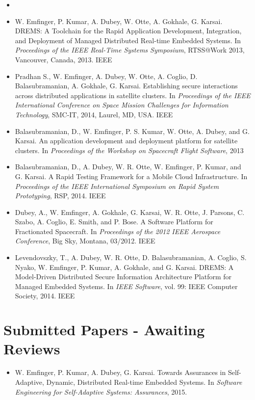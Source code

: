 \begin{itemize}
	
	\item {}
	
	
	\item W. Emfinger, P. Kumar, A. Dubey, W. Otte, A. Gokhale, G. Karsai. DREMS: A Toolchain for the Rapid Application Development, Integration, and Deployment of Managed Distributed Real-time Embedded Systems. In \textit{Proceedings of the IEEE Real-Time Systems Symposium}, RTSS@Work 2013, Vancouver, Canada, 2013. IEEE
	
	
	\item Pradhan S., W. Emfinger, A. Dubey, W. Otte, A. Coglio, D. Balasubramanian, A. Gokhale, G. Karsai. Establishing secure interactions across distributed applications in satellite clusters. In \textit{Proceedings of the IEEE International Conference on Space Mission Challenges for Information Technology}, SMC-IT, 2014, Laurel, MD, USA. IEEE
	
	
	\item Balasubramanian, D., W. Emfinger, P. S. Kumar, W. Otte, A. Dubey, and G. Karsai. An application development and deployment platform for satellite clusters.  In \textit { Proceedings of the Workshop on Spacecraft Flight Software}, 2013
	
	\item Balasubramanian, D., A. Dubey, W. R. Otte, W. Emfinger, P. Kumar, and G. Karsai. A Rapid Testing Framework for a Mobile Cloud Infrastructure.  In \textit{Proceedings of the IEEE International Symposium on Rapid System Prototyping}, RSP, 2014. IEEE
	
	\item Dubey, A., W. Emfinger, A. Gokhale, G. Karsai, W. R. Otte, J. Parsons, C. Szabo, A. Coglio, E. Smith, and P. Bose. A Software Platform for Fractionated Spacecraft. In \textit{Proceedings of the 2012 IEEE Aerospace Conference}, Big Sky, Montana, 03/2012. IEEE
	
	\item Levendovszky, T., A. Dubey, W. R. Otte, D. Balasubramanian, A. Coglio, S. Nyako, W. Emfinger, P. Kumar, A. Gokhale, and G. Karsai. DREMS: A Model-Driven Distributed Secure Information Architecture Platform for Managed Embedded Systems. In \textit{IEEE Software}, vol. 99: IEEE Computer Society, 2014. IEEE
	
\end{itemize}

\section{Submitted Papers - Awaiting Reviews}
\begin{itemize}
	\item W. Emfinger, P. Kumar, A. Dubey, G. Karsai. Towards Assurances in Self-Adaptive, Dynamic, Distributed Real-time Embedded Systems. In \textit{Software Engineering for Self-Adaptive Systems: Assurances}, 2015.
\end{itemize}
